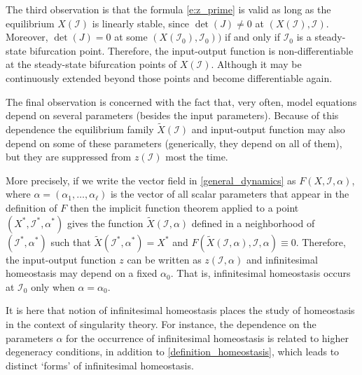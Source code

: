 \documentclass[a4paper,fleqn]{cas-dc}
\newcommand{\II}{{\mathcal I}}
\begin{document}
The third observation is that the formula \eqref{e:z_prime} is valid as long as the equilibrium $X(\II)$ is linearly stable, since $\det(J)\neq 0$ at $(X(\II),\II)$.
Moreover, $\det(J)=0$ at some $(X(\II_0),\II_0))$ if and only if $\II_0$ is a steady-state bifurcation point.
Therefore, the input-output function is non-differentiable at the steady-state bifurcation points of $X(\II)$. 
Although it may be continuously extended beyond those points and become differentiable again.

The final observation is concerned with the fact that, very often, model equations depend on several parameters (besides the input parameters).
Because of this dependence the equilibrium family $\tilde{X}(\II)$ and input-output function may also depend on some of these parameters (generically, they depend on all of them), but they are suppressed from $z(\II)$ most the time.

More precisely, if we write the vector field in \eqref{general_dynamics} as $F(X,\II,\alpha)$, where $\alpha=(\alpha_1,\ldots,\alpha_\ell)$ is the vector of all scalar parameters that appear in the definition of $F$ then
the implicit function theorem applied to a point $(X^*,\II^*,\alpha^*)$ gives the function $\tilde{X}(\II,\alpha)$ defined in a neighborhood of $(\II^*,\alpha^*)$ such that $\tilde{X}(\II^*,\alpha^*) = X^*$ and $F(\tilde{X}(\II,\alpha),\II,\alpha) \equiv 0$.
Therefore, the input-output function $z$ can be written as $z(\II,\alpha)$ and infinitesimal homeostasis may depend on a fixed $\alpha_0$.
That is, infinitesimal homeostasis occurs at $\II_0$ only when $\alpha=\alpha_0$.

It is here that notion of infinitesimal homeostasis places the study of homeostasis in the context of singularity theory.
For instance, the dependence on the parameters $\alpha$ for the occurrence of infinitesimal homeostasis is related to higher degeneracy conditions, in addition to \eqref{definition_homeostasis}, which leads to distinct `forms' of infinitesimal homeostasis.
\end{document}
